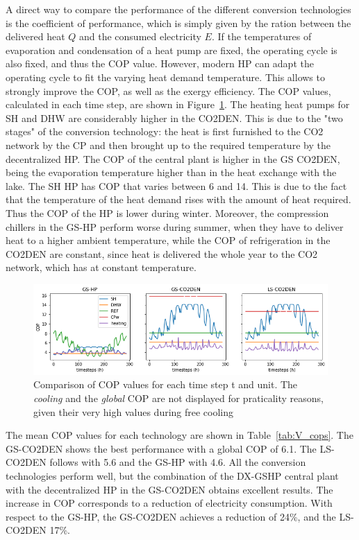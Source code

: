 \documentclass{article}
\begin{document}
A direct way to compare the performance of the different conversion technologies is the coefficient of performance, which is simply given by the ration between the delivered heat $Q$ and the consumed electricity $E$. If the temperatures of evaporation and condensation of a heat pump are fixed, the operating cycle is also fixed, and thus the COP value. However, modern HP can adapt the operating cycle to fit the varying heat demand temperature. This allows to strongly improve the COP, as well as the exergy efficiency. The COP values, calculated in each time step, are shown in Figure~\ref{fig:v_cop}. 
The heating heat pumps for SH and DHW are considerably higher in the CO2DEN. This is due to the "two stages" of the conversion technology: the heat is first furnished to the CO2 network by the CP and then brought up to the required temperature by the decentralized HP. 
The COP of the central plant is higher in the GS CO2DEN, being the evaporation temperature higher than in the heat exchange with the lake. 
The SH HP has COP that varies between 6 and 14. This is due to the fact that the temperature of the heat demand rises with the amount of heat required. Thus the COP of the HP is lower during winter.
Moreover, the compression chillers in the GS-HP perform worse during summer, when they have to deliver heat to a higher ambient temperature, while the COP of refrigeration in the CO2DEN are constant, since heat is delivered the whole year to the CO2 network, which has at constant temperature.

\begin{figure}[tph]
	\centering
	\includegraphics[width=1\linewidth]{Images/V_COP}
	\caption{Comparison of COP values for each time step t and unit. The \textit{cooling } and the \textit{global} COP are not displayed for praticality reasons, given their very high values during free cooling}
	\label{fig:v_cop}
\end{figure}

The mean COP values for each technology are shown in Table~\ref{tab:V_cops}. The GS-CO2DEN shows the best performance with a global COP of 6.1. The LS-CO2DEN follows with 5.6 and the GS-HP with 4.6. All the conversion technologies perform well, but the combination of the DX-GSHP central plant with the decentralized HP in the GS-CO2DEN obtains excellent results. The increase in COP corresponds to a reduction of electricity consumption. With respect to the GS-HP, the GS-CO2DEN achieves a reduction of 24\%, and the LS-CO2DEN 17\%.
\end{document}
